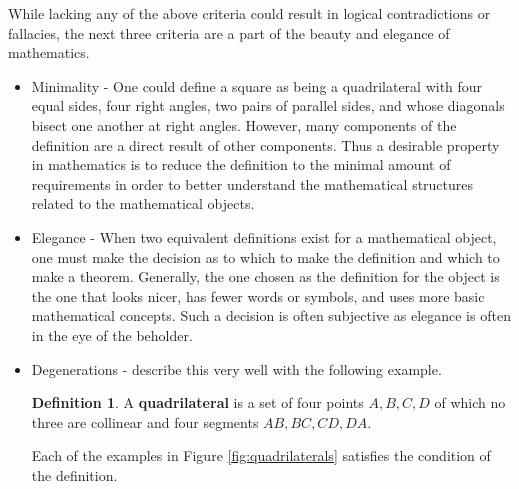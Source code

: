\documentclass[
]{book}
\theoremstyle{definition}
\newtheorem{definition}{Definition}[chapter]
\theoremstyle{definition}
\theoremstyle{definition}
\theoremstyle{definition}
\theoremstyle{remark}
\begin{document}
While lacking any of the above criteria could result in logical contradictions or fallacies, the next three criteria are a part of the beauty and elegance of mathematics.

\begin{itemize}
\item
  Minimality - One could define a square as being a quadrilateral with four equal sides, four right angles, two pairs of parallel sides, and whose diagonals bisect one another at right angles. However, many components of the definition are a direct result of other components. Thus a desirable property in mathematics is to reduce the definition to the minimal amount of requirements in order to better understand the mathematical structures related to the mathematical objects.
\item
  Elegance - When two equivalent definitions exist for a mathematical object, one must make the decision as to which to make the definition and which to make a theorem. Generally, the one chosen as the definition for the object is the one that looks nicer, has fewer words or symbols, and uses more basic mathematical concepts. Such a decision is often subjective as elegance is often in the eye of the beholder.
\item
  Degenerations - \citet{Dormolen2003} describe this very well with the following example.

  \begin{definition}
  \protect\hypertarget{def:quadrilateral}{}\label{def:quadrilateral}A \textbf{quadrilateral} is a set of four points \(A, B, C, D\) of which no three are collinear and four segments \(AB, BC, CD, DA\).
  \end{definition}

  Each of the examples in Figure \ref{fig:quadrilaterals} satisfies the condition of the definition.

  \begin{figure}


\end{figure}
\end{itemize}
\end{document}
